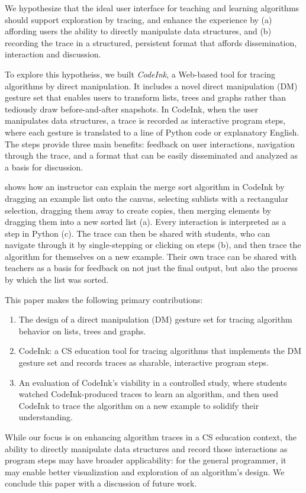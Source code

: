 We hypothesize that the ideal user interface for teaching and learning
algorithms should support exploration by tracing, and enhance the experience by
(a) affording users the ability to directly manipulate data structures, and
(b) recording the trace in a structured, persistent format that affords
dissemination, interaction and discussion.

To explore this hypotheiss, we built \emph{CodeInk}, a Web-based tool for
tracing algorithms by direct manipulation. It includes a novel direct
manipulation (DM) gesture set that enables users to transform lists, trees and
graphs rather than tediously draw before-and-after snapshots. In CodeInk, when
the user manipulates data structures, a trace is recorded as interactive program
steps, where each gesture is translated to a line of Python code or explanatory
English. The steps provide three main benefits: feedback on user interactions,
navigation through the trace, and a format that can be easily disseminated and
analyzed as a basis for discussion.

 shows how an instructor can explain the merge sort
algorithm in CodeInk by dragging an example list onto the canvas, selecting
sublists with a rectangular selection, dragging them away to create copies, then
merging elements by dragging them into a new sorted list
(a).
Every interaction is interpreted as a step in Python (c).
The trace can then be shared with students, who can navigate through it by
single-stepping or clicking on steps (b), and then trace
the algorithm for themselves on a new example. Their own trace can be shared
with teachers as a basis for feedback on not just the final output, but also the
process by which the list was sorted.

This paper makes the following primary contributions:

\begin{enumerate}

\item The design of a direct manipulation (DM) gesture set for tracing algorithm
behavior on lists, trees and graphs.

\item CodeInk: a CS education tool for tracing algorithms that implements the DM
gesture set and records traces as sharable, interactive program steps.

\item An evaluation of CodeInk's viability in a controlled study, where students
watched CodeInk-produced traces to learn an algorithm, and then used CodeInk to
trace the algorithm on a new example to solidify their understanding.

\end{enumerate}

While our focus is on enhancing algorithm traces in a CS education context, the
ability to directly manipulate data structures and record those interactions as
program steps may have broader applicability: for the general programmer, it may
enable better visualization and exploration of an algorithm's design. We
conclude this paper with a discussion of future work.
